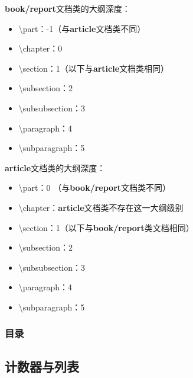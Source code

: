 \documentclass{ctexart}
\begin{document}
            \textbf{book/report}文档类的大纲深度：

            \begin{itemize}
                \item \textbackslash part：-1（与\textbf{article}文档类不同）
                \item \textbackslash chapter：0
                \item \textbackslash section：1（以下与\textbf{article}文档类相同）
                \item \textbackslash subsection：2
                \item \textbackslash subsubsection：3
                \item \textbackslash paragraph：4
                \item \textbackslash subparagraph：5
            \end{itemize}

            \textbf{article}文档类的大纲深度：

            \begin{itemize}
                \item \textbackslash part：0 （与\textbf{book/report}文档类不同）
                \item \textbackslash chapter：\textbf{article}文档类不存在这一大纲级别
                \item \textbackslash section：1（以下与\textbf{book/report}类文档相同）
                \item \textbackslash subsection：2
                \item \textbackslash subsubsection：3
                \item \textbackslash paragraph：4
                \item \textbackslash subparagraph：5
            \end{itemize}


        \subsubsection{目录}

    \subsection{计数器与列表}
\end{document}
